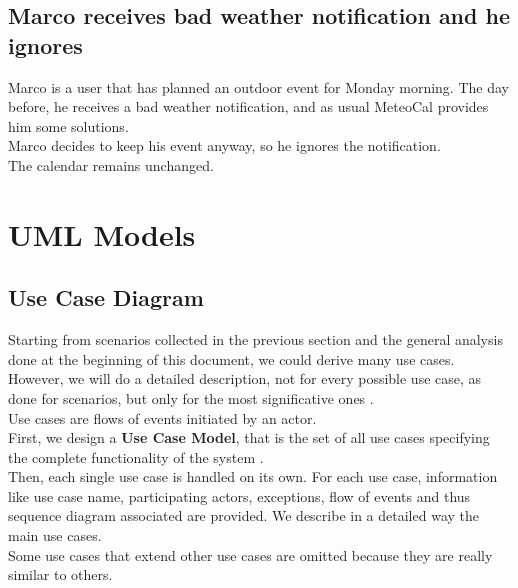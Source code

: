 \documentclass[12pt]{book}
\begin{document}
\section{Marco receives bad weather notification and he ignores}
Marco is a user that has planned an outdoor event for Monday morning. The day before, he receives a bad weather notification, and as usual MeteoCal provides him some solutions. \\
Marco decides to keep his event anyway, so he ignores the notification. \\ The calendar remains unchanged.

\chapter{UML Models}
\section{Use Case Diagram}
Starting from scenarios collected in the previous section and the general analysis done at the beginning of this document, we could derive many use cases. However, we will do a detailed description, not for every possible use case, as done for scenarios, but only for the most significative ones . \\

Use cases are flows of events initiated by an actor. \\

First, we design a \textbf{Use Case Model}, that is the set of all use cases specifying the complete functionality of the system .\\ 

Then, each single use case is handled on its own. For each use case, information like use case name, participating actors, exceptions, flow of events and thus sequence diagram associated are provided. We describe in a detailed way the main use cases.\\ Some use cases that extend other use cases are omitted because they are really similar to others. \\ 
\end{document}
